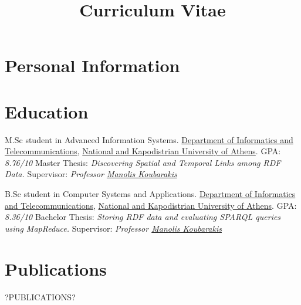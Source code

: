 \documentclass[11pt,a4paper,roman]{moderncv} %
\title{Curriculum Vitae}
\begin{document}
\makecvtitle %




\section{Personal Information}





\section{Education}

{M.Sc student in Advanced Information Systems.}
{\href{http://www.di.uoa.gr/eng}{Department of Informatics and Telecommunications}, \href{http://en.uoa.gr}{National and Kapodistrian University of Athens}.}
{GPA: \emph{8.76/10}}
{Master Thesis: \emph{Discovering Spatial and Temporal Links among RDF Data.}}
{Supervisor: \emph{Professor \href{http://cgi.di.uoa.gr/~koubarak/}{Manolis Koubarakis}}}

{B.Sc student in Computer Systems and Applications.}
{\href{http://www.di.uoa.gr/eng}{Department of Informatics and Telecommunications}, \href{http://en.uoa.gr}{National and Kapodistrian University of Athens}.}
{GPA: \emph{8.36/10}}
{Bachelor Thesis: \emph{Storing RDF data and evaluating SPARQL queries using MapReduce.}}
{Supervisor: \emph{Professor \href{http://cgi.di.uoa.gr/~koubarak/}{Manolis Koubarakis}}}



\section{Publications}
?PUBLICATIONS?
\end{document}
